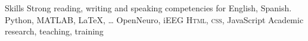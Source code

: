 
\begin{rubric}{Skills}
\entry*[Languages]
	Strong reading, writing and speaking competencies for English, Spanish.
	Python, MATLAB, \LaTeX, \ldots
\entry*[Databases]
	OpenNeuro, iEEG
	\textsc{Html, css}, JavaScript
\entry*[Misc.]
	Academic research, teaching, training
\end{rubric}
